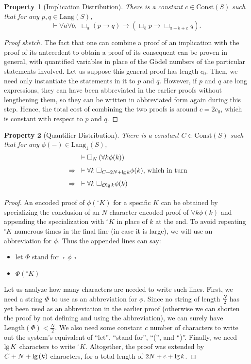 \documentclass[onecolumn,authordate]{miri-tech-article}
\newtheorem{property}{Property}
\numberwithin{equation}{section}
\theoremstyle{definition}
\newcommand{\Oo}{\mathcal{O}}
\newcommand{\proves}[1]{\underset{#1}{\vdash}}
\newcommand{\bx}[1]{\Box_{#1}}
\newcommand{\Lang}{\mathrm{Lang}}
\newcommand{\Const}{\mathrm{Const}}
\renewcommand{\implies}{\rightarrow}
\newcommand{\Implies}{\;\;\Rightarrow\;\;}
\newcommand{\qquote}[1]{\left\ulcorner #1 \right\urcorner}
\newcommand{\numeral}{{}^\circ}
\renewcommand{\lg}{\mathrm{lg\hspace{0.3ex}}}
\renewcommand{\-}{^{-1}}
\begin{document}
\begin{property}[Implication Distribution]
There is a constant $c\in \Const(S)$ such that for any $p,q\in\Lang(S)$,
$$\proves{} \forall a\forall b,\; \bx{a}(p\implies q) \implies (\bx{b}p \implies \bx{a+b+c} q).$$
\end{property}

\begin{proof}[Proof sketch]
The fact that one can combine a proof of an implication with the proof of its antecedent to obtain a proof of its consequent can be proven in general, with quantified variables in place of the G\"{o}del numbers of the particular statements involved.  Let us suppose this general proof has length $c_0$.  Then, we need only instantiate the statements in it to $p$ and $q$.  However, if $p$ and $q$ are long expressions, they can have been abbreviated in the earlier proofs without lengthening them, so they can be written in abbreviated form again during this step.  Hence, the total cost of combining the two proofs is around $c=2c_0$, which is constant with respect to $p$ and $q$.
\end{proof}

\begin{property}[Quantifier Distribution]
There is a constant $C\in \Const(S)$ such that for any $\phi(-) \in \Lang_1(S)$,
\begin{align*}
             &\proves{}\bx{N}\left(\forall k \phi(k)\right)\\
\Implies &\proves{} \forall k \; \bx{C+2N+\lg k} \phi(k)\text{, which in turn}\\
\Implies &\proves{} \forall k \; \bx{\Oo\lg k} \phi(k)
\end{align*}
\end{property}

\begin{proof}
An encoded proof of $\phi(\numeral K)$ for a specific $K$ can be obtained by specializing the conclusion of an $N$-character encoded proof of $\forall k \phi(k)$ and appending the specialization with $\numeral K$ in place of $k$ at the end.  To avoid repeating $\numeral K$ numerous times in the final line (in case it is large), we will use an abbreviation for $\phi$.  Thus the appended lines can say:
\begin{itemize}
\item[(1)] let $\Phi$ stand for $\qquote{\phi}$
\item[(2)] $\Phi(\numeral K)$
\end{itemize}
Let us analyze how many characters are needed to write such lines.  First, we need a string $\Phi$ to use as an abbreviation for $\phi$.  Since no string of length $\frac{N}{2}$ has yet been used as an abbreviation in the earlier proof (otherwise we can shorten the proof by not defining and using the abbreviation), we can surely have $\mathrm{Length}(\Phi)<\frac{N}{2}$.  We also need some constant $c$ number of characters to write out the system's equivalent of ``let'', ``stand for'', ``('', and ``)''.  Finally, we need $\lg K$ characters to write $\numeral K$.  Altogether, the proof was extended by $C+N+\lg(k)$ characters, for a total length of $2N+c+\lg k$.  
\end{proof}
\end{document}
